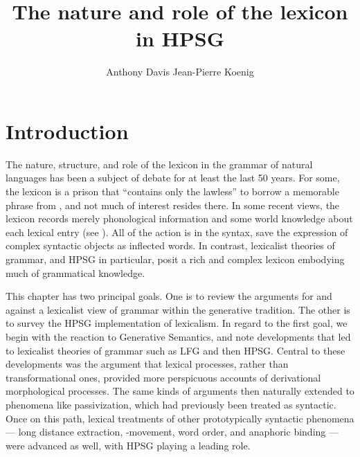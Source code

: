 \documentclass[output=paper]{langsci/langscibook}
\author{%
Anthony Davis\affiliation{Southern Oregon University}%
\lastand Jean-Pierre Koenig\affiliation{University at Buffalo}%
}
\title{The nature and role of the lexicon in HPSG}
\begin{document}
\label{chap-lexicon}


\section{Introduction}

The nature, structure, and role of the lexicon in the grammar of natural languages has been a subject of debate for at least the last 50 years. For some, the lexicon is a prison that ``contains only the lawless''  to borrow a memorable phrase from , and not much of interest resides there. In some recent views, the lexicon records merely phonological information and some world knowledge about each lexical entry (see \citet{Marantz1997}). All of the action is in the syntax, save the expression of complex syntactic objects as inflected words.
In contrast, lexicalist theories of grammar, and HPSG in particular, posit a rich and complex lexicon embodying much of grammatical knowledge.

This chapter has two principal goals.  One is to review the arguments for and against a lexicalist view of grammar within the generative tradition.  The other is to survey the HPSG implementation of lexicalism. In regard to the first goal, we begin with the reaction to Generative Semantics, and note developments that led to lexicalist theories of grammar such as LFG and then HPSG.  Central to these developments was the argument that lexical processes, rather than transformational ones, provided more perspicuous accounts of derivational morphological processes.  The same kinds of arguments then naturally extended to phenomena like passivization, which had previously been treated as syntactic.  Once on this path, lexical treatments of other prototypically syntactic phenomena — long distance extraction, -movement, word order, and anaphoric binding — were advanced as well, with HPSG playing a leading role.
\end{document}
